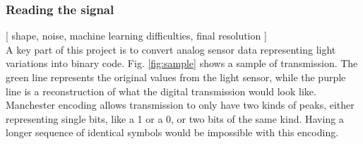  \subsubsection{Reading the signal}
[ shape, noise, machine learning difficulties, final resolution ]\\
A key part of this project is to convert analog sensor data representing light variations into binary code.
Fig. \ref{fig:sample} shows a sample of transmission. The green line represents the original values from the light sensor, while the purple line is a reconstruction of what the digital transmission would look like. Manchester encoding allows transmission to only have two kinds of peaks, either representing single bits, like a 1 or a 0, or two bits of the same kind.
Having a longer sequence of identical symbols would be impossible with this encoding.\\


